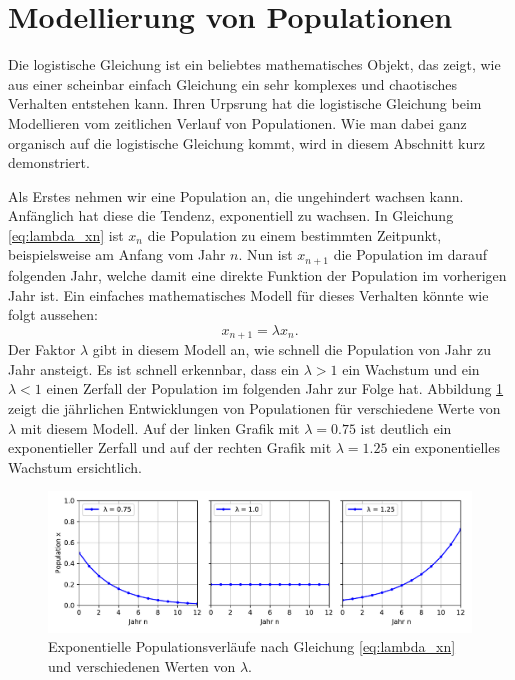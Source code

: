 %
%
%
\section{Modellierung von Populationen
\label{logistic:section:einleitung}}

Die logistische Gleichung ist ein beliebtes mathematisches Objekt,
das zeigt, wie aus einer scheinbar einfach Gleichung
ein sehr komplexes und chaotisches Verhalten entstehen kann. 
Ihren Urpsrung hat die logistische Gleichung beim Modellieren
vom zeitlichen Verlauf von Populationen. 
Wie man dabei ganz organisch auf die logistische Gleichung 
kommt, wird in diesem Abschnitt kurz demonstriert. 

Als Erstes nehmen wir eine Population an, 
die ungehindert wachsen kann. 
Anfänglich hat diese die Tendenz, exponentiell zu wachsen. 
In Gleichung \eqref{eq:lambda_xn} ist $x_{n}$ die Population zu einem bestimmten Zeitpunkt, 
beispielsweise am Anfang vom Jahr $n$. 
Nun ist $x_{n+1}$ die Population im darauf folgenden Jahr, 
welche damit eine direkte Funktion der Population im vorherigen
Jahr ist. 
Ein einfaches mathematisches Modell für dieses Verhalten
könnte wie folgt aussehen:
\begin{equation}
    \label{eq:lambda_xn}
    x_{n+1} = \lambda x_{n}\text{.}
\end{equation}
Der Faktor $\lambda$ gibt in diesem Modell an, 
wie schnell die Population von Jahr zu Jahr ansteigt. 
Es ist schnell erkennbar, 
dass ein $\lambda > 1$ ein Wachstum und
ein $\lambda < 1$ einen Zerfall
der Population im folgenden Jahr zur Folge hat. 
Abbildung \ref{fig:pop_exp} zeigt die jährlichen
Entwicklungen von Populationen für verschiedene
Werte von $\lambda$ mit diesem Modell.
Auf der linken Grafik mit $\lambda = 0.75$ ist deutlich
ein exponentieller Zerfall und auf 
der rechten Grafik mit $\lambda = 1.25$
ein exponentielles Wachstum ersichtlich.
\begin{figure}
    \includegraphics[width=\linewidth]{papers/logistic/figures/pop_exp.pdf}
    \caption{
        Exponentielle Populationsverläufe nach
        Gleichung \eqref{eq:lambda_xn}
        und verschiedenen Werten von $\lambda$.
    }
    \label{fig:pop_exp}
\end{figure}

